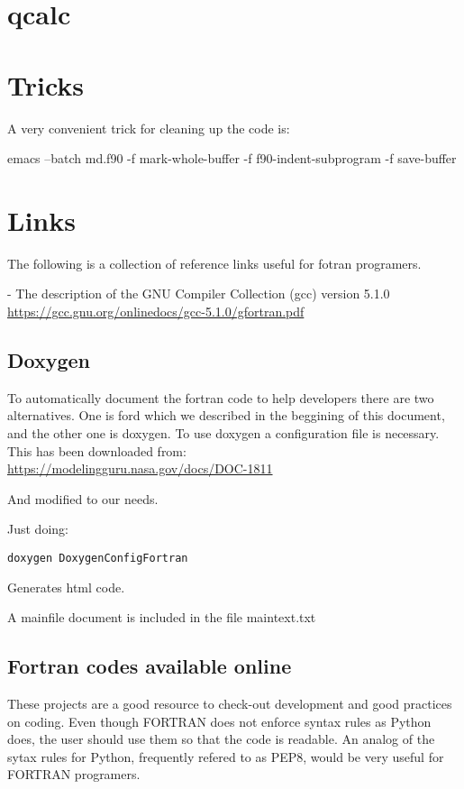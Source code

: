 \documentclass[10pt, oneside, pdftex]{article}
\begin{document}
\section{qcalc}
\label{qcalc}


\section{Tricks}
\label{tricks}

A very convenient trick for cleaning up the code is:

emacs --batch md.f90 -f mark-whole-buffer -f f90-indent-subprogram -f save-buffer


\section{Links}
\label{links}
The following  is a  collection of reference  links useful  for fotran
programers.


\noindent - The description of the GNU Compiler Collection (gcc) version 5.1.0\\
\url{https://gcc.gnu.org/onlinedocs/gcc-5.1.0/gfortran.pdf}


\subsection{Doxygen}
\label{doxygen}
To automatically  document the fortran  code to help  developers there
are two alternatives. One is ford  which we described in the beggining
of this  document, and  the other  one is doxygen.   To use  doxygen a
configuration file is necessary.  This has been downloaded from:\\

\url{https://modelingguru.nasa.gov/docs/DOC-1811}

And modified to our needs.

Just doing:

\begin{lstlisting}
doxygen DoxygenConfigFortran
\end{lstlisting}

Generates html code.

A mainfile document is included in the file maintext.txt


\subsection{Fortran codes available online}
These projects are  a good resource to check-out  development and good
practices on coding. Even though FORTRAN does not enforce syntax rules
as  Python  does,  the user  should  use  them  so  that the  code  is
readable. An analog of the  sytax rules for Python, frequently refered
to as PEP8, would be very useful for FORTRAN programers. \\
\end{document}
